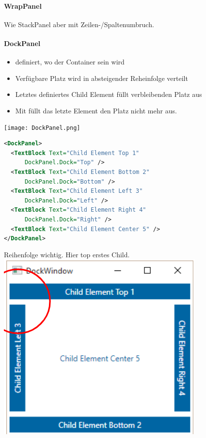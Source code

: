 \paragraph{WrapPanel} Wie StackPanel aber mit Zeilen-/Spaltenumbruch. 


\paragraph{DockPanel}
\begin{itemize}
    \item {} definiert, wo der Container sein wird
    \item Verfügbare Platz wird in absteigender Reheinfolge verteilt
    \item Letztes definiertes Child Element füllt verbleibenden Platz aus
    \item Mit  füllt das letzte Element den Platz nicht mehr aus.
\end{itemize}
\texttt{[image: DockPanel.png]}
\begin{lstlisting}[language=xml]
<DockPanel> 
  <TextBlock Text="Child Element Top 1" 
      DockPanel.Dock="Top" /> 
  <TextBlock Text="Child Element Bottom 2" 
      DockPanel.Dock="Bottom" /> 
  <TextBlock Text="Child Element Left 3" 
      DockPanel.Dock="Left" /> 
  <TextBlock Text="Child Element Right 4" 
      DockPanel.Dock="Right" /> 
  <TextBlock Text="Child Element Center 5" /> 
</DockPanel>
\end{lstlisting}
Reihenfolge wichtig. Hier top erstes Child.
\includegraphics[scale=0.3]{img/dockpanelbeispiel.png}


